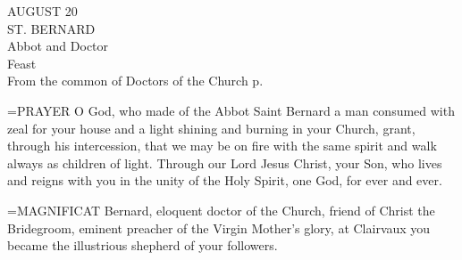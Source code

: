 \begin{center}\normalsize AUGUST 20\\
\footnotesize ST. BERNARD\\
\footnotesize Abbot and Doctor\\
\footnotesize Feast\\
\footnotesize From the common of Doctors of the Church p. \\
\end{center}

\hangindent=\parindent \small{PRAYER 
O God, who made of the Abbot Saint Bernard
a man consumed with zeal for your house
and a light shining and burning in your Church,
grant, through his intercession,
that we may be on fire with the same spirit
and walk always as children of light.
Through our Lord Jesus Christ, your Son,
who lives and reigns with you in the unity of the Holy Spirit,
one God, for ever and ever.\\}
 

\hangindent=\parindent \small{MAGNIFICAT  Bernard, eloquent doctor of the Church, friend of
Christ the Bridegroom, eminent preacher of the Virgin Mother’s
glory, at Clairvaux you became the illustrious shepherd of your
followers.\\}
 


